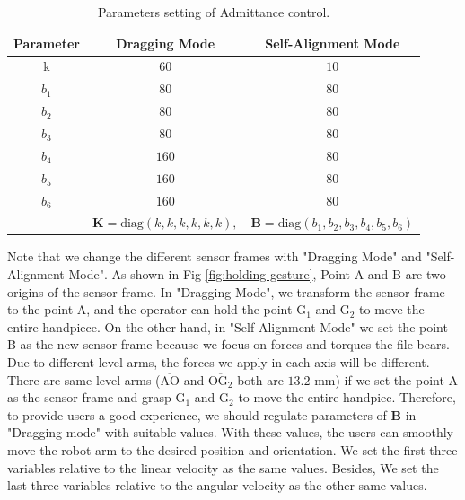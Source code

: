 \begin{table}[htbp]
\centering
\caption{Parameters setting of Admittance control.}
\label{tab: para_adm}
\begin{tabular}{ccc} 
\hline \hline
Parameter	&Dragging Mode		&Self-Alignment Mode	\\
\hline
k			&$60$			&$10$				\\
$b_1$		&$80$				&$80$					\\
$b_2$		&$80$				&$80$					\\
$b_3$		&$80$				&$80$					\\
$b_4$		&$160$				&$80$					\\
$b_5$		&$160$				&$80$					\\
$b_6$		&$160$				&$80$					\\
\hline	
&$\mathbf{K} = \text{diag}(k,k,k,k,k,k),$ &$\mathbf{B} = \text{diag}(b_1,b_2,b_3,b_4,b_5,b_6)$\\
\hline\hline	
\end{tabular}
\end{table}
\par
Note that we change the different sensor frames with "Dragging Mode" and "Self-Alignment Mode". As shown in Fig \ref{fig:holding gesture}, Point A and B are two origins of the sensor frame. In "Dragging Mode", we transform the sensor frame to the point A, and the operator can hold the point $\mathrm{G_1}$ and $\mathrm{G_2}$ to move the entire handpiece. On the other hand, in "Self-Alignment Mode" we set  the point B as the new sensor frame because we focus on forces and torques the file bears. Due to different level arms, the forces we apply in each axis will be different. There are same level arms ($\overline{\mathrm{AO}}$ and $\overline{\mathrm{OG_2}}$ both are $13.2$ mm) if we set the point A as the sensor frame and grasp $\mathrm{G_1}$ and $\mathrm{G_2}$ to move the entire handpiec. Therefore, to provide users a good experience, we should regulate parameters of $\mathbf{B}$ in "Dragging mode" with suitable values. With these values, the users can smoothly move the robot arm to the desired position and orientation. We set the first three variables relative to the linear velocity as the same values. Besides, We set the last three variables relative to the angular velocity as the other same values.
